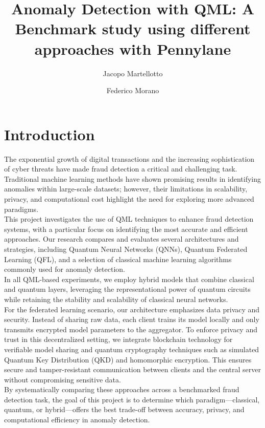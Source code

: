 \documentclass[10pt]{article}
\title{\textbf{Anomaly Detection with QML: A Benchmark study using different approaches with Pennylane}}
\author[1]{Jacopo Martellotto}
\affil[1]{\small\texttt{j.martellotto@studenti.unipi.it}}
\date{}
\author[2]{Federico Morano}
\affil[2]{\small\texttt{f.morano1@studenti.unipi.it}}
\date{}
\begin{document}
\maketitle

\section{Introduction}
The exponential growth of digital transactions and the increasing sophistication of cyber threats have made fraud detection a critical and challenging task. Traditional machine learning methods have shown promising results in identifying anomalies within large-scale datasets; however, their limitations in scalability, privacy, and computational cost highlight the need for exploring more advanced paradigms.\\
This project investigates the use of QML techniques to enhance fraud detection systems, with a particular focus on identifying the most accurate and efficient approaches. Our research compares and evaluates several architectures and strategies, including Quantum Neural Networks (QNNs), Quantum Federated Learning (QFL), and a selection of classical machine learning algorithms commonly used for anomaly detection.\\
In all QML-based experiments, we employ hybrid models that combine classical and quantum layers, leveraging the representational power of quantum circuits while retaining the stability and scalability of classical neural networks.\\
For the federated learning scenario, our architecture emphasizes data privacy and security. Instead of sharing raw data, each client trains its model locally and only transmits encrypted model parameters to the aggregator. To enforce privacy and trust in this decentralized setting, we integrate blockchain technology for verifiable model sharing and quantum cryptography techniques such as simulated Quantum Key Distribution (QKD) and homomorphic encryption. This ensures secure and tamper-resistant communication between clients and the central server without compromising sensitive data.\\
By systematically comparing these approaches across a benchmarked fraud detection task, the goal of this project is to determine which paradigm—classical, quantum, or hybrid—offers the best trade-off between accuracy, privacy, and computational efficiency in anomaly detection.
\end{document}
